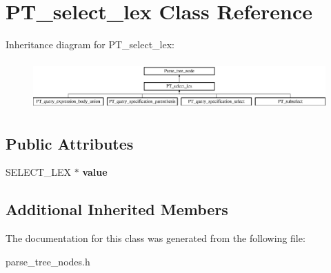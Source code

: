 \hypertarget{classPT__select__lex}{}\section{P\+T\+\_\+select\+\_\+lex Class Reference}
\label{classPT__select__lex}
Inheritance diagram for P\+T\+\_\+select\+\_\+lex\+:\begin{figure}[H]
\begin{center}
\leavevmode
\includegraphics[height=1.875000cm]{classPT__select__lex}
\end{center}
\end{figure}
\subsection*{Public Attributes}
\begin{DoxyCompactItemize}
\item 
\mbox{\label{classPT__select__lex_ae61b3a0bc4e3985b3275983ef8b2551f}} 
S\+E\+L\+E\+C\+T\+\_\+\+L\+EX $\ast$ {\bfseries value}
\end{DoxyCompactItemize}
\subsection*{Additional Inherited Members}


The documentation for this class was generated from the following file\+:\begin{DoxyCompactItemize}
\item 
parse\+\_\+tree\+\_\+nodes.\+h\end{DoxyCompactItemize}
